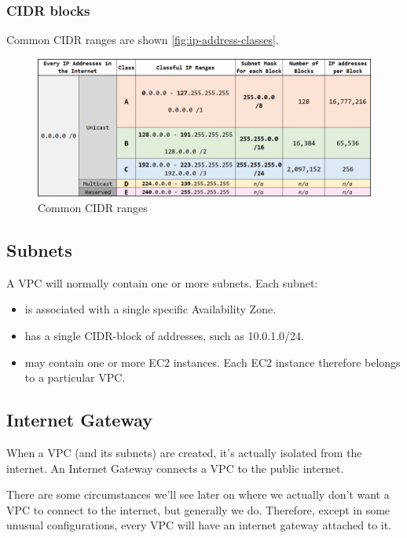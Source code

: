 \documentclass{pgnotes}
\begin{document}
\subsubsection{CIDR blocks}

Common CIDR ranges are shown \autoref{fig:ip-address-classes}.

\begin{figure}[htbp]
  \centering
  \includegraphics[width=1.0\linewidth]{ip_address_classes}
  \caption{Common CIDR ranges}
  \label{fig:ip-address-classes}
\end{figure}

\subsection{Subnets}

A VPC will normally contain one or more subnets. 
Each subnet:

\begin{itemize}
\item
  is associated with a single specific Availability Zone.
\item
  has a single CIDR-block of addresses, such as 10.0.1.0/24.
\item
  may contain one or more EC2 instances.
  Each EC2 instance therefore belongs to a particular VPC.
\end{itemize}

\subsection{Internet Gateway}

When a VPC (and its subnets) are created, it's actually isolated from the internet.
An Internet Gateway connects a VPC to the public internet.

There are some circumstances we'll see later on where we actually don't want a VPC to connect to the internet, but generally we do.
Therefore, except in some unusual configurations, every VPC will have an internet gateway attached to it.
\end{document}
